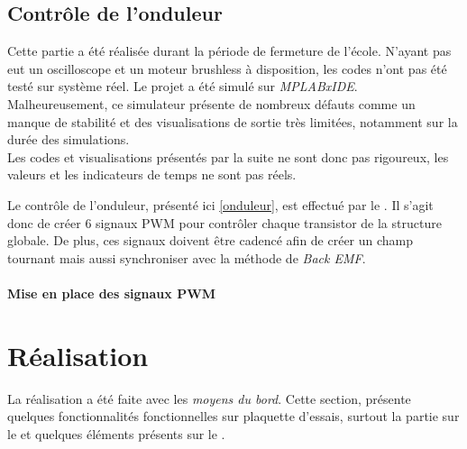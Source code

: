 			\subsection{Contrôle de l'onduleur}			
			\begin{tcolorbox}[center,width=0.9\textwidth, colframe=red!90!orange, colback=orange!25, arc=3mm,boxrule=1mm, sharp corners=east,title=Note]
			Cette partie a été réalisée durant la période de fermeture de l'école. N'ayant pas eut un oscilloscope et un moteur brushless à disposition, les codes n'ont pas été testé sur système réel. Le projet a été simulé sur \textit{MPLABxIDE}. Malheureusement, ce simulateur présente de nombreux défauts comme un manque de stabilité et des visualisations de sortie très limitées, notamment sur la durée des simulations.\\
  			Les codes et visualisations présentés par la suite ne sont donc pas rigoureux, les valeurs et les indicateurs de temps ne sont pas réels.
  			\end{tcolorbox}
  			Le contrôle de l'onduleur, présenté ici \ref{onduleur}, est effectué par le \dspic . Il s'agit donc de créer 6 signaux  PWM pour contrôler chaque transistor de la structure globale. De plus, ces signaux doivent être cadencé afin de créer un champ tournant mais aussi synchroniser avec la méthode de \textit{Back EMF}.
  			\paragraph{Mise en place des signaux PWM}
  			
	\section{Réalisation}
			\begin{tcolorbox}[center,width=0.9\textwidth, colframe=red!90!orange, colback=orange!25, arc=3mm,boxrule=1mm, sharp corners=east,title=Note]
			La réalisation a été faite avec les \textit{moyens du bord}. Cette section, présente quelques fonctionnalités fonctionnelles sur plaquette d'essais, surtout la partie sur le \pic et quelques éléments présents sur le \dspic .
  			\end{tcolorbox}
  			
  			
